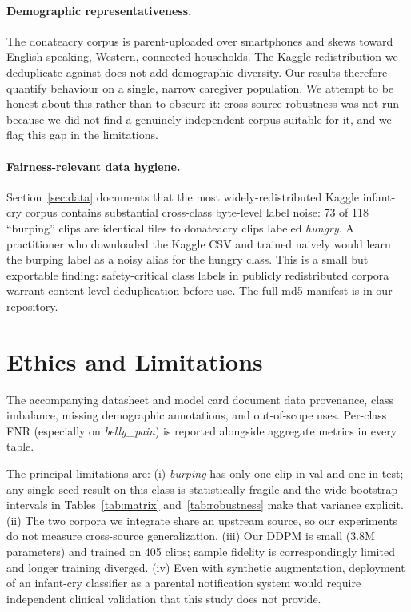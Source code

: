 \documentclass[final]{article}
\begin{document}
\paragraph{Demographic representativeness.} The donateacry corpus is parent-uploaded over smartphones and skews toward English-speaking, Western, connected households. The Kaggle redistribution we deduplicate against does not add demographic diversity. Our results therefore quantify behaviour on a single, narrow caregiver population. We attempt to be honest about this rather than to obscure it: cross-source robustness was not run because we did not find a genuinely independent corpus suitable for it, and we flag this gap in the limitations.

\paragraph{Fairness-relevant data hygiene.} Section~\ref{sec:data} documents that the most widely-redistributed Kaggle infant-cry corpus contains substantial cross-class byte-level label noise: 73 of 118 ``burping'' clips are identical files to donateacry clips labeled \textit{hungry}. A practitioner who downloaded the Kaggle CSV and trained naively would learn the burping label as a noisy alias for the hungry class. This is a small but exportable finding: safety-critical class labels in publicly redistributed corpora warrant content-level deduplication before use. The full md5 manifest is in our repository.

\section{Ethics and Limitations}\label{sec:ethicslim}
The accompanying datasheet and model card document data provenance, class imbalance, missing demographic annotations, and out-of-scope uses. Per-class FNR (especially on \textit{belly\_pain}) is reported alongside aggregate metrics in every table.

The principal limitations are: (i) \textit{burping} has only one clip in val and one in test; any single-seed result on this class is statistically fragile and the wide bootstrap intervals in Tables~\ref{tab:matrix} and~\ref{tab:robustness} make that variance explicit. (ii) The two corpora we integrate share an upstream source, so our experiments do not measure cross-source generalization. (iii) Our DDPM is small (3.8M parameters) and trained on 405 clips; sample fidelity is correspondingly limited and longer training diverged. (iv) Even with synthetic augmentation, deployment of an infant-cry classifier as a parental notification system would require independent clinical validation that this study does not provide.
\end{document}

